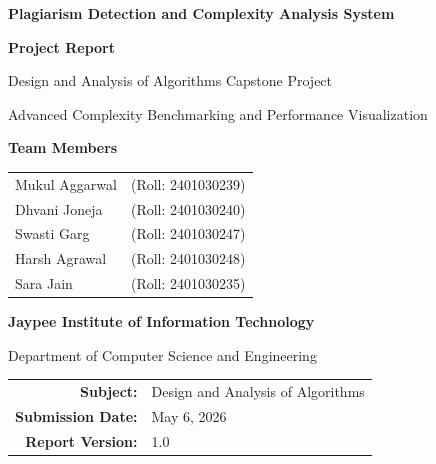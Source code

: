 \documentclass[12pt,oneside,openany]{report}
\begin{document}
\thispagestyle{empty}

\begin{titlepage}
\centering
\vspace*{2cm}

{\Large\bfseries Plagiarism Detection and Complexity Analysis System\par}
{\Large\bfseries Project Report\par}

\vspace{1.5cm}

{\large Design and Analysis of Algorithms Capstone Project\par}
{\normalsize Advanced Complexity Benchmarking and Performance Visualization\par}

\vspace{2.5cm}

{\normalsize\bfseries Team Members\par}
\vspace{0.8cm}

\begin{tabular}{ll}
Mukul Aggarwal      & (Roll: 2401030239) \\
Dhvani Joneja       & (Roll: 2401030240) \\
Swasti Garg         & (Roll: 2401030247) \\
Harsh Agrawal       & (Roll: 2401030248) \\
Sara Jain           & (Roll: 2401030235) \\
\end{tabular}

\vspace{2cm}

{\normalfont\bfseries Jaypee Institute of Information Technology\par}
{\normalsize Department of Computer Science and Engineering\par}

\vfill

\begin{tabular}{rl}
\textbf{Subject:}        & Design and Analysis of Algorithms \\
\textbf{Submission Date:}  & May 6, 2026 \\
\textbf{Report Version:}   & 1.0 \\
\end{tabular}

\vspace{1.5cm}
\end{titlepage}
\end{document}
